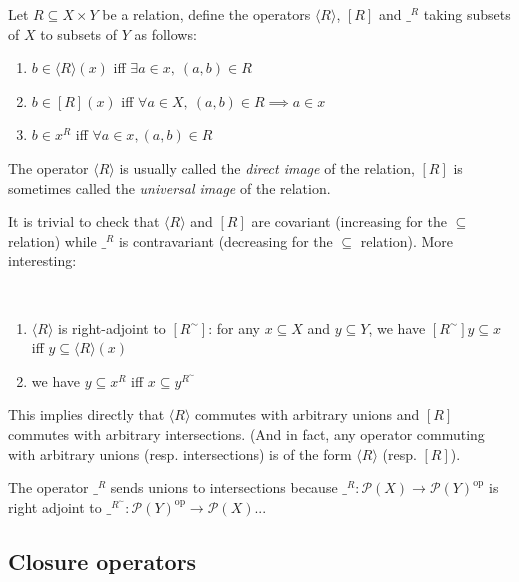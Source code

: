 \begin{definition}
Let $R\subseteq X\times Y$ be a relation, define the operators $\langle R\rangle$, $[R]$ and $\_^R$ taking subsets of $X$ to subsets of $Y$ as follows:
\begin{enumerate}
\item $b\in\langle R\rangle(x)$ iff $\exists a\in x,\ (a,b)\in R$
\item $b\in[R](x)$ iff $\forall a\in X,\ (a,b)\in R \implies a\in x$
\item $b\in x^R$ iff $\forall a\in x, (a,b)\in R$
\end{enumerate}
\end{definition}

The operator \(\langle R\rangle\) is usually called the \emph{direct
image} of the relation, \([R]\) is sometimes called the \emph{universal
image} of the relation.

It is trivial to check that \(\langle R\rangle\) and \([R]\) are
covariant (increasing for the \(\subseteq\) relation) while \(\_^R\) is
contravariant (decreasing for the \(\subseteq\) relation). More
interesting:

\begin{lemma}\
\begin{enumerate}
\item $\langle R\rangle$ is right-adjoint to $[R^\sim]$: for any $x\subseteq X$ and $y\subseteq Y$, we have $[R^\sim]y \subseteq x$ iff $y\subseteq \langle R\rangle(x)$
\item we have $y\subseteq x^R$ iff $x\subseteq y^{R^\sim}$
\end{enumerate}
\end{lemma}

This implies directly that \(\langle R\rangle\) commutes with arbitrary
unions and \([R]\) commutes with arbitrary intersections. (And in fact,
any operator commuting with arbitrary unions (resp. intersections) is of
the form \(\langle R\rangle\) (resp. \([R]\)).

\begin{remark}
The operator $\_^R$ sends unions to intersections because $\_^R : \mathcal{P}(X) \to \mathcal{P}(Y)^\mathrm{op}$ is right adjoint to $\_^{R^\sim} : \mathcal{P}(Y)^{\mathrm{op}} \to \mathcal{P}(X)$...
\end{remark}


\subsection{Closure operators}\label{closure-operators}

